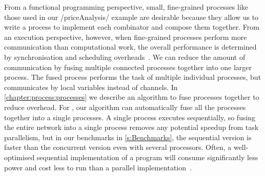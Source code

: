 
From a functional programming perspective, small, fine-grained processes like those used in our \Hs/priceAnalysis/ example are desirable because they allow us to write a process to implement each combinator and compose them together.
From an execution perspective, however, when fine-grained processes perform more communication than computational work, the overall performance is determined by synchronisation and scheduling overheads~\cite{chen1990impact}.
We can reduce the amount of communication by fusing multiple connected processes together into one larger process.
The fused process performs the task of multiple individual processes, but communicates by local variables instead of channels.
In \cref{chapter:process:processes} we describe an algorithm to fuse processes together to reduce overhead.
For \Hs@priceAnalysis@, our algorithm can automatically fuse all the processes together into a single processes.
A single process executes sequentially, so fusing the entire network into a single process removes any potential speedup from task parallelism, but in our benchmarks in \cref{s:Benchmarks}, the sequential version is faster than the concurrent version even with several processors.
Often, a well-optimised sequential implementation of a program will consume significantly less power and cost less to run than a parallel implementation~\cite{mcsherry2015scalability}.


